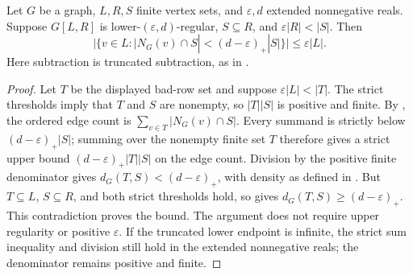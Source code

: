 \begin{lemma}
Let $G$ be a graph, $L,R,S$ finite vertex sets, and $\varepsilon,d$ extended
nonnegative reals. Suppose $G[L,R]$ is lower-$(\varepsilon,d)$-regular,
$S\subseteq R$, and $\varepsilon|R|<|S|$. Then
\[
 |\{v\in L:|N_G(v)\cap S|<(d-\varepsilon)_+|S|\}|
       \leq\varepsilon|L|.
\]
Here subtraction is truncated subtraction, as in
.
\end{lemma}
\begin{proof}
Let $T$ be the displayed bad-row set and suppose $\varepsilon|L|<|T|$.
The strict thresholds imply that $T$ and $S$ are nonempty, so
$|T||S|$ is positive and finite. By ,
the ordered edge count is $\sum_{v\in T}|N_G(v)\cap S|$.
Every summand is strictly below $(d-\varepsilon)_+|S|$; summing over
the nonempty finite set $T$ therefore gives a strict upper bound
$(d-\varepsilon)_+|T||S|$ on the edge count. Division by the positive
finite denominator gives $d_G(T,S)<(d-\varepsilon)_+$, with density
as defined in . But $T\subseteq L$, $S\subseteq R$,
and both strict thresholds hold, so  gives
$d_G(T,S)\geq(d-\varepsilon)_+$. This contradiction proves the bound.
The argument does not require upper regularity or positive $\varepsilon$.
If the truncated lower endpoint is infinite, the strict sum inequality
and division still hold in the extended nonnegative reals; the
denominator remains positive and finite.
\end{proof}

